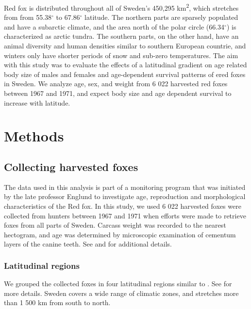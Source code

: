 \documentclass[12pt, a4paper]{article}
\begin{document}
Red fox is distributed throughout all of Sweden's 450,295 km\textsuperscript{2}, which stretches from  from 55.38$^{\circ}$ to 67.86$^{\circ}$ latitude.  The northern parts are sparsely populated and have a subarctic climate, and the area north of the polar circle (66.34$^{\circ}$) is characterized as arctic tundra. The southern parts, on the other hand, have an animal  diversity and human densities similar to southern European countrie, and winters only have shorter periods of snow and sub-zero temperatures. The aim with this study was to evaluate the effects of a latitudinal gradient on age related body size of males and females and age-dependent survival patterns of ered foxes in Sweden. We analyze age, sex, and weight from 6 022 harvested red foxes between 1967 and 1971, and expect body size and age dependent survival to increase with latitude.


\section*{Methods}

\subsection*{Collecting harvested foxes}

The data used in this analysis is part of a monitoring program that was initiated by the late professor Englund to investigate age, reproduction and morphological characteristics of the Red fox. In this study, we used 6 022 harvested foxes were collected from hunters between 1967 and 1971 when efforts were made to retrieve foxes from all parts of Sweden. Carcass weight was recorded to the nearest hectogram, and age was determined by microscopic examination of cementum layers of the canine teeth.  See \citep{englund1965studies} and \cite{englund1970some} for additional details.

\subsubsection*{Latitudinal regions}



We grouped the collected foxes in four latitudinal regions similar to \cite{englund1970some}.  See \citep{zhengEstimatingNetPrimary2004, GeographySweden2025,MarkanvandningenSverigeLand2013} for more details. Sweden covers a wide range of climatic zones, and stretches more than 1 500 km from south to north.
\end{document}
